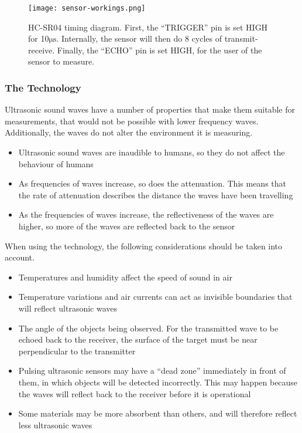 \begin{figure}[htbp]
  \centering
  \texttt{[image: sensor-workings.png]}
  \caption[HC-SR04 timing diagram]{HC-SR04 timing diagram. First, the \enquote{TRIGGER} pin is set HIGH for 10$\si{\micro\second}$. Internally, the sensor will then do 8 cycles of transmit-receive. Finally, the \enquote{ECHO} pin is set HIGH, for the user of the sensor to measure.}
  \label{fig:sensor-workings}
\end{figure}

\subsubsection{The Technology}
Ultrasonic sound waves have a number of properties that make them suitable for measurements, that would not be possible with lower frequency waves. Additionally, the waves do not alter the environment it is measuring.

\begin{itemize}
\item Ultrasonic sound waves are inaudible to humans, so they do not affect the behaviour of humans
\item As frequencies of waves increase, so does the attenuation. This means that the rate of attenuation describes the distance the waves have been travelling
\item As the frequencies of waves increase, the reflectiveness of the waves are higher, so more of the waves are reflected back to the sensor
\end{itemize}

When using the technology, the following considerations should be taken into account.

\begin{itemize}
  \item Temperatures and humidity affect the speed of sound in air
  \item Temperature variations and air currents can act as invisible boundaries that will reflect ultrasonic waves
  \item The angle of the objects being observed. For the transmitted wave to be echoed back to the receiver, the surface of the target must be near perpendicular to the transmitter
  \item Pulsing ultrasonic sensors may have a \enquote{dead zone} immediately in front of them, in which objects will be detected incorrectly. This may happen because the waves will reflect back to the receiver before it is operational
  \item Some materials may be more absorbent than others, and will therefore reflect less ultrasonic waves
\end{itemize}

